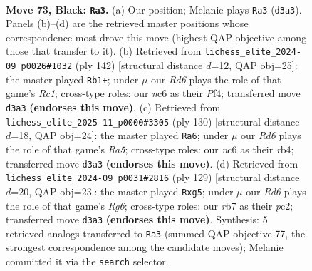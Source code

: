 \documentclass[11pt]{article}
\begin{document}
\clearpage

\begin{figure}[p]\centering
\begin{subfigure}{0.46\textwidth}\centering
\resizebox{\linewidth}{!}{%
\newchessgame
\chessboard[
  setfen={6k1/1R4p1/2N2p2/7p/3P3P/3r2P1/6K1/8 b - - 40 73},
  showmover=false,
  pgfstyle=straightmove, color=movearrow, markmove={d3-a3}
]}
\caption{}
\end{subfigure}\hfill
\begin{subfigure}{0.46\textwidth}\centering
\resizebox{\linewidth}{!}{%
\newchessgame
\chessboard[
  setfen={8/5p2/6p1/1k4P1/2prPP2/8/4K3/2R5 w - - 0 72},
  showmover=false,
  pgfstyle=straightmove, color=movearrow, markmove={c1-b1}
]}
\caption{}
\end{subfigure}
\\[4pt]
\begin{subfigure}{0.46\textwidth}\centering
\resizebox{\linewidth}{!}{%
\newchessgame
\chessboard[
  setfen={8/5kp1/7p/R3P3/pr4P1/5K1P/8/8 w - - 15 66},
  showmover=false,
  pgfstyle=straightmove, color=movearrow, markmove={a5-a6}
]}
\caption{}
\end{subfigure}\hfill
\begin{subfigure}{0.46\textwidth}\centering
\resizebox{\linewidth}{!}{%
\newchessgame
\chessboard[
  setfen={8/6k1/R5p1/p3p1Pp/4P3/6r1/2PK4/8 b - - 6 65},
  showmover=false,
  pgfstyle=straightmove, color=movearrow, markmove={g3-g5}
]}
\caption{}
\end{subfigure}
\caption{\textbf{Move 73, Black: \texttt{Ra3}.} (a) Our position; Melanie plays \texttt{Ra3} (\texttt{d3a3}). Panels (b)--(d) are the retrieved master positions whose correspondence most drove this move (highest QAP objective among those that transfer to it). (b) Retrieved from \texttt{lichess\_elite\_2024-09\_p0026\#1032} (ply 142) [structural distance $d$=12, QAP obj=25]: the master played \texttt{Rb1+}; under $\mu$ our \emph{Rd6} plays the role of that game's \emph{Rc1}; cross-type roles: our \emph{n}c6 as their \emph{P}f4; transferred move \texttt{d3a3} \textbf{(endorses this move)}. (c) Retrieved from \texttt{lichess\_elite\_2025-11\_p0000\#3305} (ply 130) [structural distance $d$=18, QAP obj=24]: the master played \texttt{Ra6}; under $\mu$ our \emph{Rd6} plays the role of that game's \emph{Ra5}; cross-type roles: our \emph{n}c6 as their \emph{r}b4; transferred move \texttt{d3a3} \textbf{(endorses this move)}. (d) Retrieved from \texttt{lichess\_elite\_2024-09\_p0031\#2816} (ply 129) [structural distance $d$=20, QAP obj=23]: the master played \texttt{Rxg5}; under $\mu$ our \emph{Rd6} plays the role of that game's \emph{Rg6}; cross-type roles: our \emph{r}b7 as their \emph{p}c2; transferred move \texttt{d3a3} \textbf{(endorses this move)}. Synthesis: 5 retrieved analogs transferred to \texttt{Ra3} (summed QAP objective 77, the strongest correspondence among the candidate moves); Melanie committed it via the \texttt{search} selector.}
\label{fig:thought-m145}
\end{figure}
\end{document}
